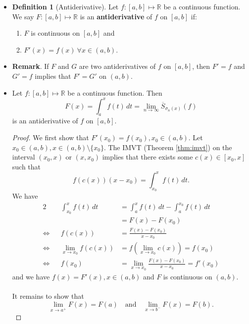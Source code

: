 \documentclass{article}
\newcommand{\R}{\mathbb{R}}
\newcommand{\?}{\stackrel{?}{=}}
\theoremstyle{definition} %
\newtheorem{definition}[theorem]{Definition} %
\begin{document}
\begin{itemize}
    \item[]
    \begin{definition}[Antiderivative]
        Let $f: [a, b] \mapsto \R$ be a continuous function. We say $F: [a, b] \mapsto \R$ is an \textbf{antiderivative} of $f$ on $[a, b]$ if:
        \begin{enumerate}
            \item $F$ is continuous on $[a, b]$ and
            \item $F'(x) = f(x) \ \forall x \in (a, b)$.
        \end{enumerate}
    \end{definition}
    \item \textbf{Remark}. If $F$ and $G$ are two antiderivatives of $f$ on $[a, b]$, then $F' = f$ and $G' = f$ implies that $F' = G'$ on $(a, b)$.
    \item[]
    \begin{lemma}
        Let $f: [a, b] \mapsto \R$ be a continuous function. Then
        $$F(x) = \int_a^x f(t) \,dt = \lim_{n \to \infty} \overline{S}_{\sigma_n(x)}(f)$$
        is an antiderivative of $f$ on $[a, b]$.
    \end{lemma}
    \begin{proof}
        We first show that $F'(x_0) = f(x_0), x_0 \in (a, b)$. Let $x_0 \in (a, b), x \in (a, b) \setminus \{x_0\}$. The IMVT (Theorem \ref{thm:imvt}) on the interval $(x_0, x)$ or $(x, x_0)$ implies that there exists some $c(x) \in [x_0, x]$ such that
        $$f(c(x))(x - x_0) = \int_{x_0}^x f(t) \,dt.$$
        We have
        \begin{alignat*}{2}
            &&\int_{x_0}^x f(t) \,dt &= \int_a^x f(t) \,dt - \int_a^{x_0} f(t) \,dt \\
            && &= F(x) - F(x_0) \\
            \iff&& f(c(x)) &= \frac{F(x) - F(x_0)}{x - x_0} \\
            \iff&&\lim_{x \to x_0} f(c(x)) &= f\left(\lim_{x \to x_0} c(x)\right) = f(x_0) \\
            \iff&&f(x_0) &= \lim_{x \to x_0} \frac{F(x) - F(x_0)}{x - x_0} = f'(x_0)
        \end{alignat*}
        and we have $f(x) = F'(x), x \in (a, b)$ and $F$ is continuous on $(a, b)$. \\\\
        It remains to show that
        $$\lim_{x \to a^+} F(x) = F(a) \quad \text{and} \quad \lim_{x \to b^-} F(x) = F(b).$$

\end{proof}
\end{itemize}
\end{document}
